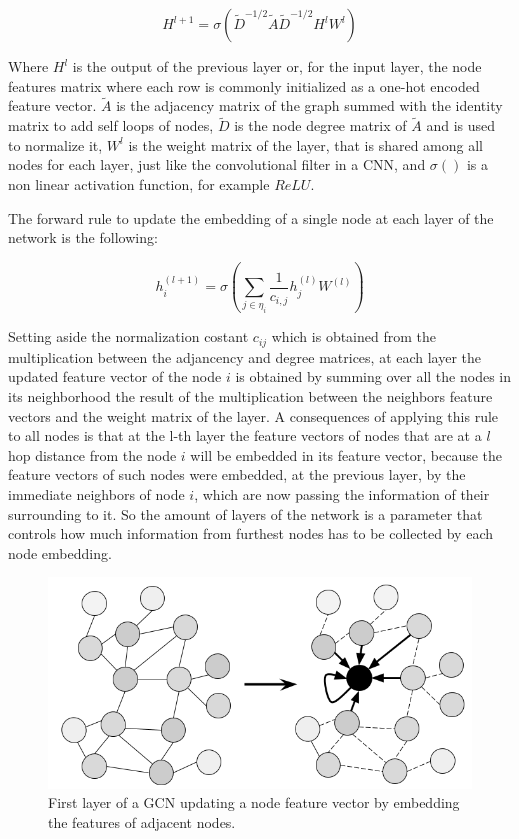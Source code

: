 \documentclass[%
    corpo=13.5pt,
    twoside,
    oldstyle,
    tipotesi=magistrale,
    greek,
    evenboxes
]{toptesi}
\begin{document}
\begin{equation} \label{gcn1}
H^{l+1}=\sigma(\tilde{D}^{-1/2}\tilde{A}\tilde{D}^{-1/2}H^lW^l)
\end{equation}

Where $H^{l}$ is the output of the previous layer or, for the input layer, the
node features matrix where each row is commonly initialized
as a one-hot encoded feature vector. $\tilde{A}$ is the adjacency matrix
of the graph summed with the identity matrix to add self loops of nodes,
$\tilde{D}$ is the node degree matrix of $\tilde{A}$ and is used to
normalize it, $W^l$ is the weight matrix of the layer, that is shared
among all nodes for each layer, just like the convolutional filter in a CNN,
and $\sigma()$ is a non linear activation function, for example $ReLU$.

The forward rule to update the embedding of a single node at each
layer of the network is the following:

\begin{equation} \label{gcn2}
    h^{(l+1)}_{i}=\sigma(\sum_{j\in\eta_{i}} \frac{1}{c_{i,j}}h_j^{(l)}W^{{(l)}})
\end{equation}

Setting aside the normalization costant $c_{ij}$ which is obtained from the
multiplication between the adjancency and degree matrices, at each layer the
updated feature vector of the node $i$ is obtained by summing over all the
nodes in its neighborhood the result of the multiplication between the
neighbors feature vectors and the weight matrix of the layer.
A consequences of applying this rule to all nodes is that at the l-th layer
the feature vectors of nodes that are at a $l$ hop distance from the node $i$
will be embedded in its feature vector, because the feature vectors of such
nodes were embedded, at the previous layer, by the immediate neighbors of
node $i$, which are now passing the information of their surrounding to it.
So the amount of layers of the network is a parameter that controls how much
information from furthest nodes has to be collected by each node embedding.

\begin{figure}[h]
    \centering
    \includegraphics[scale=0.4]{img/gcn.png}
    \caption{First layer of a GCN updating a node feature vector by embedding
        the features of adjacent nodes.}
    \label{fig:gcn}
\end{figure}
\end{document}
